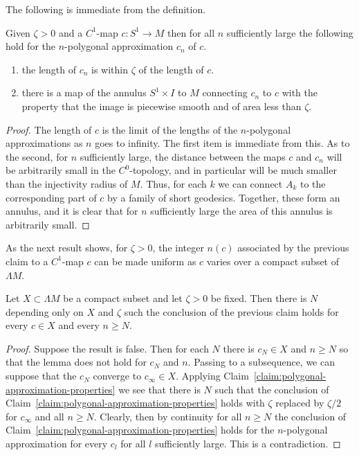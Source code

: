 The following is immediate from the definition.

\begin{claim}
\label{claim:polygonal-approximation-properties}
\label{onec}
Given $\zeta>0$ and a $C^1$-map $c\colon S^1\to M$ then for all $n$
sufficiently large the following hold for the $n$-polygonal
approximation $c_n$ of $c$.
\begin{enumerate}
\item[(a)] the length of $c_n$ is within $\zeta$ of the length of $c$.
\item[(b)] there is a map of the annulus $S^1\times I$ to $M$ connecting
$c_n$ to $c$ with the property that the image is piecewise smooth
and of area less than $\zeta$.
\end{enumerate}
\end{claim}

\begin{proof}
The length of $c$ is the limit of the lengths of the $n$-polygonal
approximations as $n$ goes to infinity. The first item is immediate
from this. As to the second, for $n$ sufficiently large, the
distance between the maps $c$ and $c_n$ will be arbitrarily small in
the $C^0$-topology, and in particular will be much smaller than the
injectivity radius of $M$. Thus, for each $k$ we can connect $A_k$
to the corresponding part of $c$ by a family of short geodesics.
Together, these form an annulus, and it is clear that for $n$
sufficiently large the area of this annulus is arbitrarily small.
\end{proof}

As the next result shows, for $\zeta>0$, the integer $n(c)$
associated by the previous claim to a $C^1$-map $c$ can be made
uniform as $c$ varies over a compact subset of $\Lambda M$.

\begin{claim}
\label{claim:polygonal-approximation-uniform}
\label{uniformc}
Let $X\subset \Lambda M$ be a compact subset and let $\zeta>0$ be
fixed. Then there is $N$ depending only on $X$ and $\zeta$ such the
conclusion of the previous claim holds for every $c\in X$ and every
$n\ge N$.
\end{claim}

\begin{proof}
Suppose the result is false. Then for each $N$ there is $c_N\in X$
and $n\ge N$ so that the lemma does not hold for $c_N$ and $n$.
Passing to a subsequence, we can suppose that the $c_N$ converge to
$c_\infty\in X$. Applying Claim~\ref{claim:polygonal-approximation-properties} we see that there is $N$
such that the conclusion of Claim~\ref{claim:polygonal-approximation-properties} holds with $\zeta$
replaced by $\zeta/2$ for $c_\infty$ and all $n\ge N$. Clearly, then
by continuity for all $n\ge N$ the conclusion of Claim~\ref{claim:polygonal-approximation-properties}
holds for the $n$-polygonal approximation for every $c_l$ for all
$l$ sufficiently large. This is a contradiction.
\end{proof}


